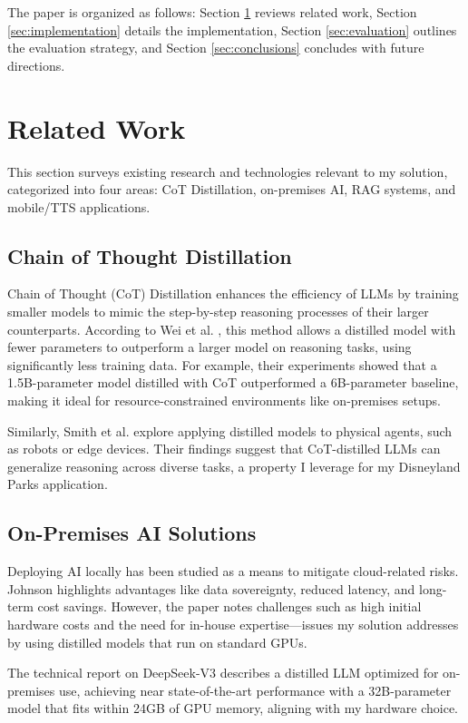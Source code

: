 \documentclass[11pt]{article}
\begin{document}
The paper is organized as follows: Section \ref{sec:related_work} reviews related work, Section \ref{sec:implementation} details the implementation, Section \ref{sec:evaluation} outlines the evaluation strategy, and Section \ref{sec:conclusions} concludes with future directions.

\section{Related Work}
\label{sec:related_work}
This section surveys existing research and technologies relevant to my solution, categorized into four areas: CoT Distillation, on-premises AI, RAG systems, and mobile/TTS applications.

\subsection{Chain of Thought Distillation}
Chain of Thought (CoT) Distillation enhances the efficiency of LLMs by training smaller models to mimic the step-by-step reasoning processes of their larger counterparts. According to Wei et al. \cite{distilling_step_by_step}, this method allows a distilled model with fewer parameters to outperform a larger model on reasoning tasks, using significantly less training data. For example, their experiments showed that a 1.5B-parameter model distilled with CoT outperformed a 6B-parameter baseline, making it ideal for resource-constrained environments like on-premises setups.

Similarly, Smith et al. \cite{embodied_cot_distillation} explore applying distilled models to physical agents, such as robots or edge devices. Their findings suggest that CoT-distilled LLMs can generalize reasoning across diverse tasks, a property I leverage for my Disneyland Parks application.

\subsection{On-Premises AI Solutions}
Deploying AI locally has been studied as a means to mitigate cloud-related risks. Johnson \cite{on_premise_ai} highlights advantages like data sovereignty, reduced latency, and long-term cost savings. However, the paper notes challenges such as high initial hardware costs and the need for in-house expertise—issues my solution addresses by using distilled models that run on standard GPUs.

The technical report on DeepSeek-V3 \cite{deepseek_v3_tech} describes a distilled LLM optimized for on-premises use, achieving near state-of-the-art performance with a 32B-parameter model that fits within 24GB of GPU memory, aligning with my hardware choice.
\end{document}
